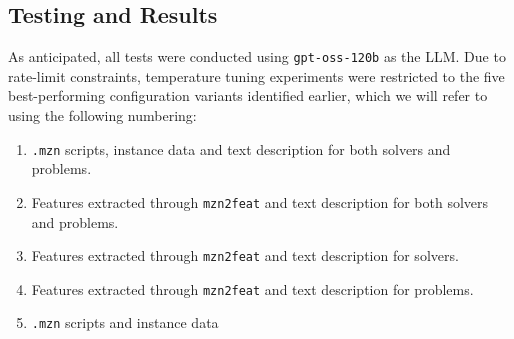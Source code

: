 \documentclass[../../main]{subfiles}
\begin{document}
\subsection{Testing and Results}
As anticipated, all tests were conducted using \texttt{gpt-oss-120b} as the LLM. Due to rate-limit constraints, temperature tuning experiments were restricted to the five best-performing configuration variants identified earlier, which we will refer to using the following numbering:
\begin{enumerate}
    \item \texttt{.mzn} scripts, instance data and text description for both solvers and problems.
    \item Features extracted through \texttt{mzn2feat} and text description for both solvers and problems.
    \item Features extracted through \texttt{mzn2feat} and text description for solvers.
    \item Features extracted through \texttt{mzn2feat} and text description for problems.
    \item \texttt{.mzn} scripts and instance data
\end{enumerate}
\end{document}
